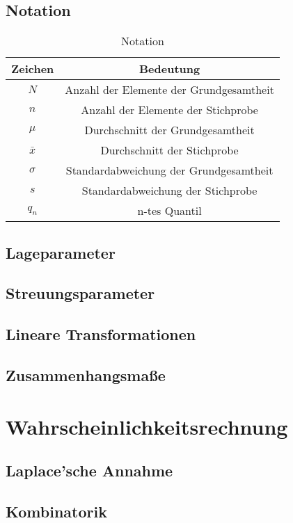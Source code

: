 \documentclass[12pt]{scrartcl}
\begin{document}
\subsection{Notation}

\begin{table}[h]
    \begin{tabular}{ | c | c | }
        \hline
        Zeichen   & Bedeutung                               \\
        \hline
        \hline
        $N$       & Anzahl der Elemente der Grundgesamtheit \\
        $n$       & Anzahl der Elemente der Stichprobe      \\
        $\mu$     & Durchschnitt der Grundgesamtheit        \\
        $\bar{x}$ & Durchschnitt der Stichprobe             \\
        $\sigma$  & Standardabweichung der Grundgesamtheit  \\
        $s$       & Standardabweichung der Stichprobe       \\
        $q_n$     & n-tes Quantil                           \\
        \hline
    \end{tabular}
    \caption{Notation}
\end{table}

\subsection{Lageparameter}
\subsection{Streuungsparameter}
\subsection{Lineare Transformationen}
\subsection{Zusammenhangsmaße}
\section{Wahrscheinlichkeitsrechnung}
\subsection{Laplace'sche Annahme}
\subsection{Kombinatorik}
\end{document}
